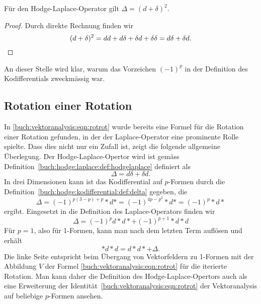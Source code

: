 \begin{satz}
Für den Hodge-Laplace-Operator gilt $\Delta = (d+\delta)^2$.
\end{satz}

\begin{proof}
Durch direkte Rechnung finden wir
\[
(d+\delta)^2
=
dd+d\delta+\delta d+\delta\delta
=
d\delta +\delta d.
\qedhere
\]
\end{proof}

An dieser Stelle wird klar, warum das Vorzeichen $(-1)^p$ in der
Definition des Kodifferentials zweckmässig war.

%
%
\subsection{Rotation einer Rotation
\label{buch:hodge:laplace:subsection:rotrot}}
In \eqref{buch:vektoranalysis:eqn:rotrot} wurde bereits eine Formel
für die Rotation einer Rotation gefunden, in der der Laplace-Operator
eine prominente Rolle spielte.
Dass dies nicht nur ein Zufall ist, zeigt die folgende allgemeine
Überlegung.
Der Hodge-Laplace-Opertor wird ist gemäss
Definition~\ref{buch:hodge:laplace:def:hodgelaplace}
definiert als 
\[
\Delta 
=
d\delta + \delta d.
\]
In drei Dimensionen kann ist das Kodifferential auf $p$-Formen durch
die Definition~\ref{buch:hodge:kodifferential:def:delta} gegeben,
die
\[
\Delta
=
(-1)^{p(3-p)+p}
{*}d{*}
=
(-1)^{4p-p^2}
{*}d{*}
=
(-1)^p
{*}d{*}
\]
ergibt.
Eingesetzt in die Definition des Laplace-Operators finden wir
\[
\Delta
=
(-1)^p
d{*}d{*}
+
(-1)^{p+1}
{*}d{*}d
\]
Für $p=1$, also für 1-Formen, kann man nach dem letzten Term auflösen
und erhält
\begin{equation}
{*}d{*}d
=
d{*}d{*}
+
\Delta.
\end{equation}
Die linke Seite entspricht beim Übergang von Vektorfeldern zu 1-Formen
mit der Abbildung $V$ der Formel \eqref{buch:vektoranalysis:eqn:rotrot}
für die iterierte Rotation.
Man kann daher die Definition des Hodge-Laplace-Opertors auch als
eine Erweiterung der Identität~\eqref{buch:vektoranalysis:eqn:rotrot}
der Vektoranalysis auf beliebige $p$-Formen ansehen.




